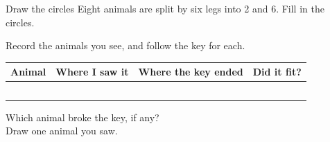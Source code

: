 \begin{puzzle}{Draw the circles}
Eight animals are split by six legs into 2 and 6. Fill in the circles.
\begin{center}
\end{center}
\end{puzzle}
\clearpage
\thispagestyle{fancy}
Record the animals you see, and follow the key for each.\par\medskip
\renewcommand{\arraystretch}{3.0}
\begin{tabularx}{\linewidth}{|>{\sffamily\small\bfseries}p{2.4cm}|X|X|X|}
\hline
Animal & Where I saw it & Where the key ended & Did it fit? \\ \hline
 & & & \\ \hline
 & & & \\ \hline
 & & & \\ \hline
 & & & \\ \hline
 & & & \\ \hline
\end{tabularx}

\vspace{8pt}
Which animal broke the key, if any? \wline[6cm]\\[10pt]
Draw one animal you saw.\par\medskip
{}
\clearpage
